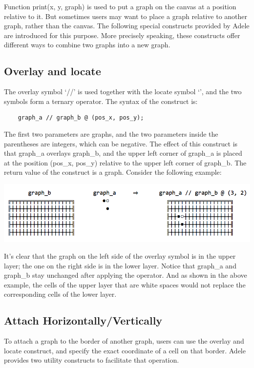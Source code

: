 \documentclass[11pt,letterpaper]{article}
\begin{document}
Function print(x, y, graph) is used to put a graph on the canvas at a position relative to it. But sometimes users may want to place a graph relative to another graph, rather than the canvas. The following special constructs provided by Adele are introduced for this purpose. More precisely speaking, these constructs offer different ways to combine two graphs into a new graph.

\subsection {Overlay and locate}

The overlay symbol ‘//’ is used together with the locate symbol ‘\@’, and the two symbols form a ternary operator. The syntax of the construct is:

\begin{lstlisting}
    graph_a // graph_b @ (pos_x, pos_y);
\end{lstlisting}

The first two parameters are graphs, and the two parameters inside the parentheses are integers, which can be negative. The effect of this construct is that graph\_a overlays graph\_b, and the upper left corner of graph\_a is placed at the position (pos\_x, pos\_y) relative to the upper left corner of graph\_b. The return value of the construct is a graph. Consider the following example:

\includegraphics[width=\textwidth]{./graph_01.png}

It's clear that the graph on the left side of the overlay symbol is in the upper layer; the one on the right side is in the lower layer. Notice that graph\_a and graph\_b stay unchanged after applying the operator. And as shown in the above example, the cells of the upper layer that are white spaces would not replace the corresponding cells of the lower layer.

\subsection {Attach Horizontally/Vertically}

To attach a graph to the border of another graph, users can use the overlay and locate construct, and specify the exact coordinate of a cell on that border. Adele provides two utility constructs to facilitate that operation.
\end{document}
